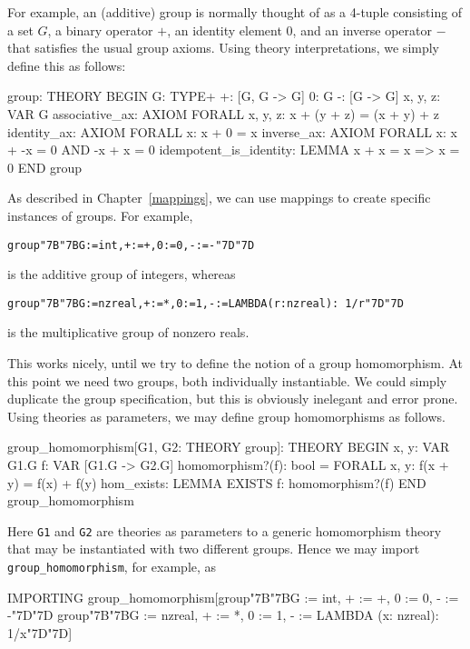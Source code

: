 \documentclass[11pt,twoside,openright,titlepage]{cslreport}
\def\mapb{\char"7B\char"7B}
\def\mape{\char"7D\char"7D}
\begin{document}
For example, an (additive) group is normally thought of as a 4-tuple
consisting of a set $G$, a binary operator $+$, an identity element $0$,
and an inverse operator $-$ that satisfies the usual group axioms.  Using
theory interpretations, we simply define this as follows:
\begin{session}
group: THEORY
 BEGIN
  G: TYPE+
  +: [G, G -> G]
  0: G
  -: [G -> G]
  x, y, z: VAR G
  associative_ax: AXIOM FORALL x, y, z: x + (y + z) = (x + y) + z
  identity_ax: AXIOM FORALL x: x + 0 = x
  inverse_ax: AXIOM FORALL x: x + -x = 0 AND -x + x = 0
  idempotent_is_identity: LEMMA x + x = x => x = 0
 END group
\end{session}

As described in Chapter~\ref{mappings}, we can use mappings to create
specific instances of groups.  For example, {\smaller\begin{alltt}
group\mapb{}G := int, + := +, 0 := 0, - := -\mape{}
\end{alltt}}
\noindent is the additive group of integers, whereas
{\smaller\begin{alltt}
group\mapb{}G := nzreal, + := *, 0 := 1, - := LAMBDA (r:nzreal):\ 1/r\mape{}
\end{alltt}}
\noindent is the multiplicative group of nonzero reals.

This works nicely, until we try to define the notion of a group
homomorphism.  At this point we need two groups, both individually
instantiable.  We could simply duplicate the group specification, but
this is obviously inelegant and error prone.  Using theories as
parameters, we may define group homomorphisms as follows.
\begin{session}
group_homomorphism[G1, G2: THEORY group]: THEORY
 BEGIN
  x, y: VAR G1.G
  f: VAR [G1.G -> G2.G]
  homomorphism?(f): bool = FORALL x, y: f(x + y) = f(x) + f(y)
  hom_exists: LEMMA EXISTS f: homomorphism?(f)
 END group_homomorphism
\end{session}
\noindent Here \texttt{G1} and \texttt{G2} are theories as parameters to a
generic homomorphism theory that may be instantiated with two different
groups.  Hence we may import \texttt{group\_homomorphism}, for example, as
\begin{session}
IMPORTING group_homomorphism[group\mapb{}G := int, + := +, 0 := 0, - := -\mape{}
                             group\mapb{}G := nzreal, + := *, 0 := 1,
                                 - := LAMBDA (x: nzreal): 1/x\mape{}]
\end{session}
\end{document}
